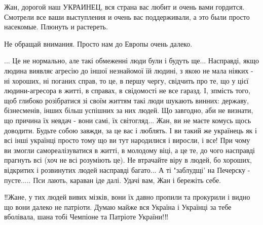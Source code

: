 \begin{itemize}
Жан, дорогой наш УКРАИНЕЦ, вся страна вас любит и очень вами гордится. Смотрели
все ваши выступления и очень вас поддерживали, а это были просто насекомые.
Плюнуть и растереть.


 
Не обращай внимания. Просто нам до Европы очень далеко.

 

... Це не нормально, але такі обмеженні люди були і будуть ще... Насправді,
якщо людина виявляє агресію до іншої незнайомої їй людині, з якою не мала
ніяких - ні хороших, ні поганих справ, то це, в першу чергу, свідчить про те,
що у цієї людини-агресора в житті, в справах, в свідомості не все гаразд. І,
зпмість того, щоб глибоко розібратися зі своїм життям такі люди шукають винних:
державу, бізнесменів, інших більш успішних за них людей. Що завгодно, аби не
визнати, що причина їх невдач - вони самі, їх світогляд... Жан, ви не маєте
комусь щось доводити. Будьте собою завжди, за це вас і люблять. І ви такий же
українець як і всі інші українці просто тому що ви тут народилися і виросли, і
все! При чому ви змогли самореалізуватися в житті, в молодому віці, а це те, до
чого насправді прагнуть всі (хоч не всі розуміють це). Не втрачайте віру в
людей, бо хороших, відкритих і розвинутих людей насправді багато... А ті
"заблудщі' на Печерску - пусте..... Пси лають, караван іде далі. Удачі вам, Жан
і бережіть себе.


 

‼️Жане, у тих людей вивих мізків, вони їх давно пропили та прокурили і видно що
вони далеко не патріоти. Думаю майже вся Україна і Українці за тебе вболівала,
шана тобі Чемпіоне та Патріоте України!‼️

 


\end{itemize}
